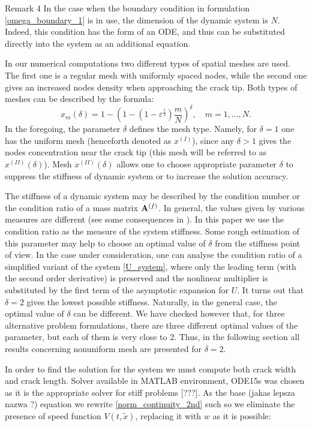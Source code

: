 {\sc Remark 4} In the case when the
boundary condition in formulation \eqref{omega_boundary_1} is in
use, the dimension of the dynamic system is $N$. Indeed, this
condition has
the form of an ODE, and thus can be substituted directly
into the system as an additional equation.

In our numerical computations two different types of spatial meshes
are used. The first one is a regular mesh with uniformly spaced
nodes,  while the second one
gives an increased nodes density when approaching
the crack tip. Both types of meshes can be described by the formula:
\begin{equation}\label{mesh_power}
 x_m(\delta)
 =1-\left(1-\left(1-\varepsilon^{\frac{1}{\delta}}\right)\frac{m}{N}\right)^{\delta}, \quad m=1,...,N.
\end{equation}
In the foregoing, the parameter $\delta$ defines the mesh type. Namely, for $\delta=1$ one has the uniform mesh (henceforth denoted as $x^{(I)}$),
since any $\delta>1$ gives the nodes concentration near the crack tip (this mesh will be referred to as $x^{(II)}(\delta)$).
Mesh $x^{(II)}(\delta)$ allows one to choose appropriate parameter
$\delta$ to suppress the stiffness of dynamic system or to increase
the solution accuracy.

The stiffness of a dynamic system
may be described by the condition number or the condition ratio
\citep{stiff_ODE} of a mass matrix ${\bf A}^{(f)}$. In general, the values
given by various measures are different (see some consequences in
\cite{MWL}). In this paper we use the condition ratio as the measure
of the system stiffness. Some rough estimation of this parameter may
help to choose an optimal value of $\delta$ from the stiffness point
of view. In the case under consideration, one can analyse the
condition ratio of a simplified variant of the system
\eqref{U_system}, where only the leading term (with the second order
derivative) is preserved and the nonlinear multiplier is substituted
by the first term of the asymptotic expansion for $U$. It turns out that
 $\delta=2$ gives the lowest possible stiffness.
Naturally, in the general case, the optimal value of $\delta$ can be
different. We have checked however that, for three alternative
problem formulations, there are three different optimal values of
the parameter, but each of them is very close to 2. Thus, in the
following section all results concerning nonuniform mesh are
presented for $\delta=2$.

In order to find the solution for the system we must compute both crack width and crack length.  Solver available in MATLAB environment, ODE15s was chosen as it is the appropriate solver for stiff problems [???].  As the base (jakas lepsza nazwa ?) equation we rewrite \eqref{norm_continuity_2nd} such so we eliminate the presence of speed function $V(t, \tilde x)$, replacing it with $w$ as it is possible:

